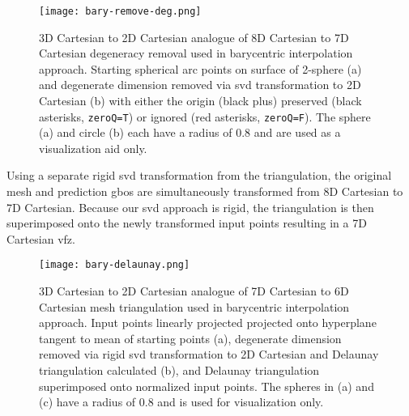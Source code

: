 \begin{figure}
    \centering
    \texttt{[image: bary-remove-deg.png]}
    \caption{3D Cartesian to 2D Cartesian analogue of 8D Cartesian to 7D Cartesian degeneracy removal used in barycentric interpolation approach. Starting spherical arc points on surface of 2-sphere (a) and degenerate dimension removed via \acrlong{svd} transformation to 2D Cartesian (b) with either the origin (black plus) preserved (black asterisks, \texttt{zeroQ=T}) or ignored (red asterisks, \texttt{zeroQ=F}). The sphere (a) and circle (b) each have a radius of 0.8 and are used as a visualization aid only.}
    \label{fig:bary-remove-deg}
\end{figure}

Using a separate rigid \gls{svd} transformation from the triangulation, the original mesh and prediction \glspl{gbo} are simultaneously transformed from 8D Cartesian to 7D Cartesian. Because our \gls{svd} approach is rigid, the triangulation is then superimposed onto the newly transformed input points resulting in a 7D Cartesian \gls{vfz}.

\begin{figure}
    \centering
    \texttt{[image: bary-delaunay.png]}
    \caption{3D Cartesian to 2D Cartesian analogue of 7D Cartesian to 6D Cartesian mesh triangulation used in barycentric interpolation approach. Input points linearly projected projected onto hyperplane tangent to mean of starting points (a), degenerate dimension removed via rigid \gls{svd} transformation to 2D Cartesian and Delaunay triangulation calculated (b), and Delaunay triangulation superimposed onto normalized input points. The spheres in (a) and (c) have a radius of 0.8 and is used for visualization only.}
    \label{fig:bary-delaunay}
\end{figure}


